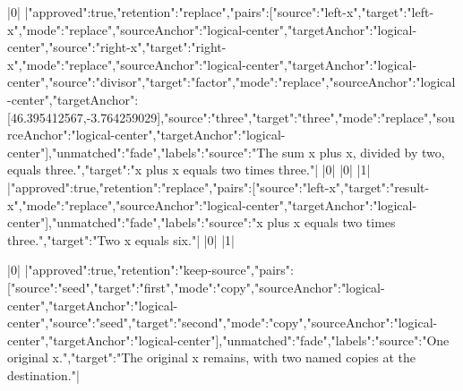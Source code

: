 \documentclass{article}
\begin{document}
\begin{loomscene}[width=960,height=540,duration=15,title={Algebra with explicit correspondence}]
\begin{loomanimation}[origin=0.75]
  \begin{loomparallel}
    \begin{loomsequence}
      |0|
      |{"approved":true,"retention":"replace","pairs":[{"source":"left-x","target":"left-x","mode":"replace","sourceAnchor":"logical-center","targetAnchor":"logical-center"},{"source":"right-x","target":"right-x","mode":"replace","sourceAnchor":"logical-center","targetAnchor":"logical-center"},{"source":"divisor","target":"factor","mode":"replace","sourceAnchor":"logical-center","targetAnchor":[46.395412567,-3.764259029]},{"source":"three","target":"three","mode":"replace","sourceAnchor":"logical-center","targetAnchor":"logical-center"}],"unmatched":"fade","labels":{"source":"The sum x plus x, divided by two, equals three.","target":"x plus x equals two times three."}}|
      |0|
      |0|
      |1|
      |{"approved":true,"retention":"replace","pairs":[{"source":"left-x","target":"result-x","mode":"replace","sourceAnchor":"logical-center","targetAnchor":"logical-center"}],"unmatched":"fade","labels":{"source":"x plus x equals two times three.","target":"Two x equals six."}}|
      |0|
      |1|
    \end{loomsequence}
    \begin{loomsequence}
      |0|
      |{"approved":true,"retention":"keep-source","pairs":[{"source":"seed","target":"first","mode":"copy","sourceAnchor":"logical-center","targetAnchor":"logical-center"},{"source":"seed","target":"second","mode":"copy","sourceAnchor":"logical-center","targetAnchor":"logical-center"}],"unmatched":"fade","labels":{"source":"One original x.","target":"The original x remains, with two named copies at the destination."}}|
    \end{loomsequence}
  \end{loomparallel}
\end{loomanimation}
\end{loomscene}
\end{document}
